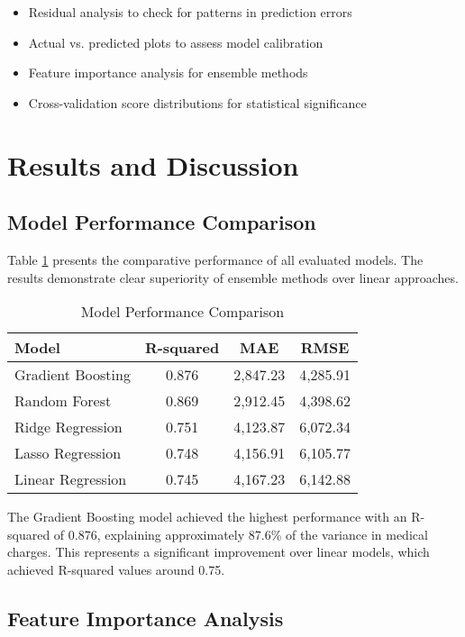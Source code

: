 \documentclass[times, twoside, watermark]{zHenriquesLab-StyleBioRxiv}
\begin{document}
\begin{itemize}
\item Residual analysis to check for patterns in prediction errors
\item Actual vs. predicted plots to assess model calibration
\item Feature importance analysis for ensemble methods
\item Cross-validation score distributions for statistical significance
\end{itemize}

\section*{Results and Discussion}

\subsection*{Model Performance Comparison}

Table \ref{tab:results} presents the comparative performance of all evaluated models. The results demonstrate clear superiority of ensemble methods over linear approaches.

\begin{table}[h]
\centering
\caption{Model Performance Comparison}
\label{tab:results}
\begin{tabular}{lccc}
\toprule
\textbf{Model} & \textbf{R-squared} & \textbf{MAE} & \textbf{RMSE} \\
\midrule
Gradient Boosting & 0.876 & 2,847.23 & 4,285.91 \\
Random Forest & 0.869 & 2,912.45 & 4,398.62 \\
Ridge Regression & 0.751 & 4,123.87 & 6,072.34 \\
Lasso Regression & 0.748 & 4,156.91 & 6,105.77 \\
Linear Regression & 0.745 & 4,167.23 & 6,142.88 \\
\bottomrule
\end{tabular}
\end{table}

The Gradient Boosting model achieved the highest performance with an R-squared of 0.876, explaining approximately 87.6\% of the variance in medical charges. This represents a significant improvement over linear models, which achieved R-squared values around 0.75.

\subsection*{Feature Importance Analysis}
\end{document}
